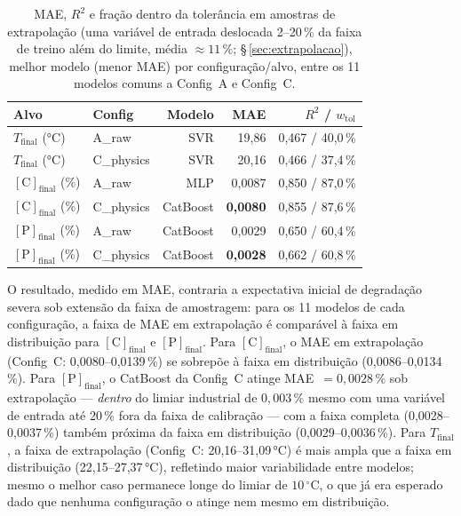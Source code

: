 \begin{table}[H]
\caption{MAE, $R^2$ e fração dentro da tolerância em amostras de extrapolação (uma variável de entrada deslocada 2--20\,\% da faixa de treino além do limite, média $\approx 11\,\%$; §\,\ref{sec:extrapolacao}), melhor modelo (menor MAE) por configuração/alvo, entre os 11 modelos comuns a Config~A e Config~C.}
\label{tbl:extrapolacao}
\centering
\footnotesize
\setlength{\tabcolsep}{5pt}
\begin{tabular}{llrrr}
\hline
\textbf{Alvo} & \textbf{Config} & \textbf{Modelo} & \textbf{MAE} & $R^2$ / $w_\text{tol}$ \\
\hline
$T_\text{final}$ (°C) & A\_raw & SVR & 19,86 & 0,467 / 40,0\,\% \\
$T_\text{final}$ (°C) & C\_physics & SVR & 20,16 & 0,466 / 37,4\,\% \\
\hline
$[\text{C}]_\text{final}$ (\%) & A\_raw & MLP & 0,0087 & 0,850 / 87,0\,\% \\
$[\text{C}]_\text{final}$ (\%) & C\_physics & CatBoost & \textbf{0,0080} & 0,855 / 87,6\,\% \\
\hline
$[\text{P}]_\text{final}$ (\%) & A\_raw & CatBoost & 0,0029 & 0,650 / 60,4\,\% \\
$[\text{P}]_\text{final}$ (\%) & C\_physics & CatBoost & \textbf{0,0028} & 0,662 / 60,8\,\% \\
\hline
\end{tabular}
\end{table}

O resultado, medido em MAE, contraria a expectativa inicial de degradação severa sob extensão da faixa de amostragem: para os 11 modelos de cada configuração, a faixa de MAE em extrapolação é comparável à faixa em distribuição para $[\text{C}]_\text{final}$ e $[\text{P}]_\text{final}$. Para $[\text{C}]_\text{final}$, o MAE em extrapolação (Config~C: 0,0080--0,0139\,\%) se sobrepõe à faixa em distribuição (0,0086--0,0134\,\%). Para $[\text{P}]_\text{final}$, o CatBoost da Config~C atinge MAE~$=0{,}0028\,\%$ sob extrapolação --- \emph{dentro} do limiar industrial de $0{,}003\,\%$ mesmo com uma variável de entrada até 20\,\% fora da faixa de calibração --- com a faixa completa (0,0028--0,0037\,\%) também próxima da faixa em distribuição (0,0029--0,0036\,\%). Para $T_\text{final}$, a faixa de extrapolação (Config~C: 20,16--31,09\,°C) é mais ampla que a faixa em distribuição (22,15--27,37\,°C), refletindo maior variabilidade entre modelos; mesmo o melhor caso permanece longe do limiar de $10\,^\circ\text{C}$, o que já era esperado dado que nenhuma configuração o atinge nem mesmo em distribuição.

